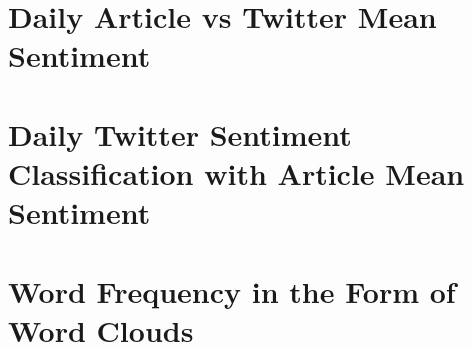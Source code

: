 \section{Daily Article vs Twitter Mean Sentiment}



\section{Daily Twitter Sentiment Classification with Article Mean Sentiment}



\section{Word Frequency in the Form of Word Clouds}

